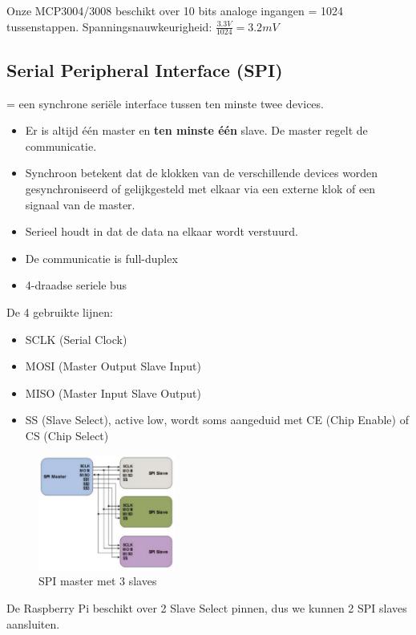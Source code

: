 \documentclass{article}
\newcommand{\bold}[1]{\textbf{#1}}
\begin{document}
Onze MCP3004/3008 beschikt over 10 bits analoge ingangen = 1024 tussenstappen. 
Spanningsnauwkeurigheid: $\frac{3.3V}{1024} = 3.2mV$

\subsection{Serial Peripheral Interface (SPI)}
= een synchrone seriële interface tussen ten minste twee devices. 

\begin{itemize}
    \item Er is altijd één master en \bold{ten minste één} slave. De master regelt de communicatie. 
    \item Synchroon betekent dat de klokken van de verschillende devices worden gesynchroniseerd of gelijkgesteld met elkaar via een externe klok of een signaal van de master. 
    \item Serieel houdt in dat de data na elkaar wordt verstuurd.
    \item De communicatie is full-duplex
    \item 4-draadse seriele bus
\end{itemize}

De 4 gebruikte lijnen:
\begin{itemize}
    \item SCLK (Serial Clock)
    \item MOSI (Master Output Slave Input)
    \item MISO (Master Input Slave Output)
    \item SS (Slave Select), active low, wordt soms aangeduid met CE (Chip Enable) of CS (Chip Select)
\end{itemize}

\begin{figure}[H]
    \centering
    \includegraphics[width=0.4\textwidth]{spi.png}
    \caption{SPI master met 3 slaves}
\end{figure}

De Raspberry Pi beschikt over 2 Slave Select pinnen, dus we kunnen 2 SPI slaves aansluiten.
\end{document}
